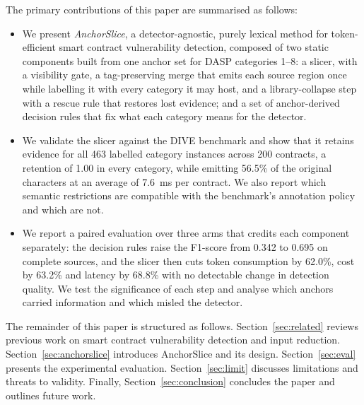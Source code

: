 \documentclass{ieeeaccess}
\begin{document}
The primary contributions of this paper are summarised as follows:
\begin{itemize}
    \item We present \emph{AnchorSlice}, a detector-agnostic, purely lexical method for token-efficient smart contract vulnerability detection, composed of two static components built from one anchor set for DASP categories 1--8: a slicer, with a visibility gate, a tag-preserving merge that emits each source region once while labelling it with every category it may host, and a library-collapse step with a rescue rule that restores lost evidence; and a set of anchor-derived decision rules that fix what each category means for the detector.
    \item We validate the slicer against the DIVE benchmark and show that it retains evidence for all 463 labelled category instances across 200 contracts, a retention of 1.00 in every category, while emitting 56.5\% of the original characters at an average of 7.6~ms per contract. We also report which semantic restrictions are compatible with the benchmark's annotation policy and which are not.
    \item We report a paired evaluation over three arms that credits each component separately: the decision rules raise the F1-score from 0.342 to 0.695 on complete sources, and the slicer then cuts token consumption by 62.0\%, cost by 63.2\% and latency by 68.8\% with no detectable change in detection quality. We test the significance of each step and analyse which anchors carried information and which misled the detector.
\end{itemize}

The remainder of this paper is structured as follows. Section~\ref{sec:related} reviews previous work on smart contract vulnerability detection and input reduction. Section~\ref{sec:anchorslice} introduces AnchorSlice and its design. Section~\ref{sec:eval} presents the experimental evaluation. Section~\ref{sec:limit} discusses limitations and threats to validity. Finally, Section~\ref{sec:conclusion} concludes the paper and outlines future work.

\end{document}
